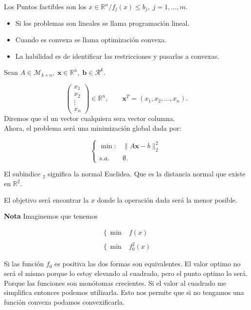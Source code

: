 Los Puntos factibles son los $x\in \mathbb{R}^n / f_j(x)\leq b_j,\; j=1,\ldots,m.$\\

\begin{itemize}
    \item  Si los problemas son lineales se llama programación lineal.
    \item Cuando es convexa se llama optimización convexa.
    \item La habilidad es de identificar las restricciones y pasarlas a convexas.
\end{itemize}

\begin{ejem}
Sean $A\in \mathcal{M}_{k\times n},\; \textbf{x}\in \mathbb{R}^n,\; \textbf{b}\in \mathcal{R}^k$.

$$
\begin{pmatrix}
    x_1\\
    x_2\\
    \vdots\\
    x_n
\end{pmatrix}
\in \mathbb{R}^n,
\qquad 
\textbf{x}^T=(x_1,x_2,\ldots,x_n).
$$
Diremos que el un vector cualquiera sera vector columna.\\

Ahora, el problema será una minimización global dada por:

$$
\left\{
\begin{array}{rl}
    \min: &\|A\textbf{x}-b\|^2_2\\
    s.a. & \emptyset.
\end{array}
\right.
$$

El subindice $_2$ significa la normal Euclidea. Que es la distancia normal que existe en $\mathbb{R}^2.$

El objetivo será encontrar la $x$ donde la operación dada será la menor posible.

\textbf{Nota}
Imaginemos que tenemos 

$$
\begin{array}{rl}
    \left\{\min\right. & f(x)\\\\
    \left\{ \min \right. & f_0^2(x)
\end{array}
$$

Si las función $f_0$ es positiva las dos formas son equivalentes. El valor optimo no será el mismo porque lo estoy elevando al cuadrado, pero el punto optimo lo será. Porque las funciones son monótomas crecientes. Si el valor al cuadrado me simplifica entonces podemos utilizarla. Esto nos permite que si no tengamos una función convexa podamos convexificarla.\\



\end{ejem}
